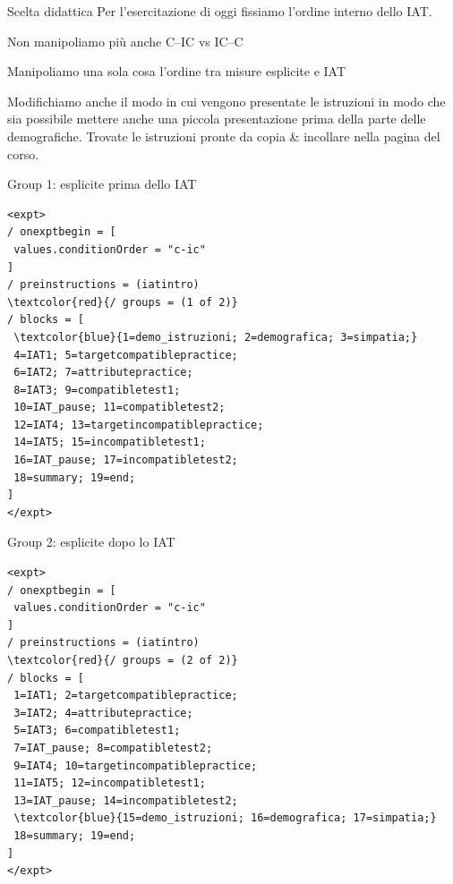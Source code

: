 \documentclass[compress]{beamer}
\begin{document}
\begin{frame}{Scelta didattica}
Per l'esercitazione di oggi fissiamo l'ordine interno dello IAT.

\vspace{4mm}
Non manipoliamo più anche C--IC vs IC--C

\vspace{4mm}
\begin{exampleblock}{Manipoliamo una sola cosa}
\centering
l'ordine tra misure esplicite e IAT
\end{exampleblock}

Modifichiamo anche il modo in cui vengono presentate le istruzioni in modo che sia possibile mettere anche una piccola presentazione prima della parte delle demografiche. Trovate le istruzioni pronte da copia \& incollare nella pagina del corso. 
\end{frame}

\begin{frame}[fragile]{Group 1: esplicite prima dello IAT}
\begin{footnotesize}
\begin{Verbatim}[commandchars=\\\{\}]
<expt>
/ onexptbegin = [
 values.conditionOrder = "c-ic"
]
/ preinstructions = (iatintro)
\textcolor{red}{/ groups = (1 of 2)}
/ blocks = [
 \textcolor{blue}{1=demo_istruzioni; 2=demografica; 3=simpatia;}
 4=IAT1; 5=targetcompatiblepractice;
 6=IAT2; 7=attributepractice;
 8=IAT3; 9=compatibletest1;
 10=IAT_pause; 11=compatibletest2;
 12=IAT4; 13=targetincompatiblepractice;
 14=IAT5; 15=incompatibletest1;
 16=IAT_pause; 17=incompatibletest2;
 18=summary; 19=end;
]
</expt>
\end{Verbatim}
\end{footnotesize}
\end{frame}

\begin{frame}[fragile]{Group 2: esplicite dopo lo IAT}
\begin{footnotesize}
\begin{Verbatim}[commandchars=\\\{\}]
<expt>
/ onexptbegin = [
 values.conditionOrder = "c-ic"
]
/ preinstructions = (iatintro)
\textcolor{red}{/ groups = (2 of 2)}
/ blocks = [
 1=IAT1; 2=targetcompatiblepractice;
 3=IAT2; 4=attributepractice;
 5=IAT3; 6=compatibletest1;
 7=IAT_pause; 8=compatibletest2;
 9=IAT4; 10=targetincompatiblepractice;
 11=IAT5; 12=incompatibletest1;
 13=IAT_pause; 14=incompatibletest2;
 \textcolor{blue}{15=demo_istruzioni; 16=demografica; 17=simpatia;}
 18=summary; 19=end;
]
</expt>
\end{Verbatim}
\end{footnotesize}
\end{frame}
\end{document}
